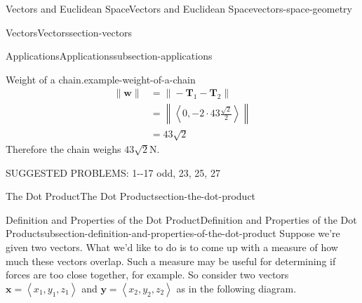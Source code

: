 \documentclass[oneside,10pt,]{book}
\numberwithin{equation}{section}
\newcommand{\vv}[1]{\mathbf{#1}}
\newcommand{\dotprod}[1]{\left\langle #1 \right\rangle}
\begin{document}
\begin{chapterptx}{Vectors and Euclidean Space}{}{Vectors and Euclidean Space}{}{}{vectors-space-geometry}
\begin{sectionptx}{Vectors}{}{Vectors}{}{}{section-vectors}
\begin{subsectionptx}{Applications}{}{Applications}{}{}{subsection-applications}
\begin{example}{Weight of a chain.}{example-weight-of-a-chain}
\begin{align*}
\|\vv{w}\| & = \|-\vv{T}_{1}-\vv{T}_{2}\| \\
& = \left\|\dotprod{0,-2\cdot43\frac{\sqrt{2}}{2}}\right\|\\
& = 43\sqrt{2} 
\end{align*}
\hypertarget{p-1123}{}%
Therefore the chain weighs \(43\sqrt{2}\)\si{\newton}.%
\end{example}
%
\hypertarget{p-1124}{}%
SUGGESTED PROBLEMS: 1-{}-{}17 odd, 23, 25, 27%
\end{subsectionptx}
\end{sectionptx}
%
%
\typeout{************************************************}
\typeout{************************************************}
%
\begin{sectionptx}{The Dot Product}{}{The Dot Product}{}{}{section-the-dot-product}
%
%
\typeout{************************************************}
\typeout{************************************************}
%
\begin{subsectionptx}{Definition and Properties of the Dot Product}{}{Definition and Properties of the Dot Product}{}{}{subsection-definition-and-properties-of-the-dot-product}
\hypertarget{p-1125}{}%
Suppose we're given two vectors. What we'd like to do is to come up with a measure of how much these vectors overlap. Such a measure may be useful for determining if forces are too close together, for example. So consider two vectors \(\vv{x} = \dotprod{x_{1},y_{1},z_{1}}\) and \(\vv{y} = \dotprod{x_{2},y_{2},z_{2}}\) as in the following diagram.%
\begin{figure}
\centering
{
}
\end{figure}
\end{subsectionptx}
\end{sectionptx}
\end{chapterptx}
\end{document}
